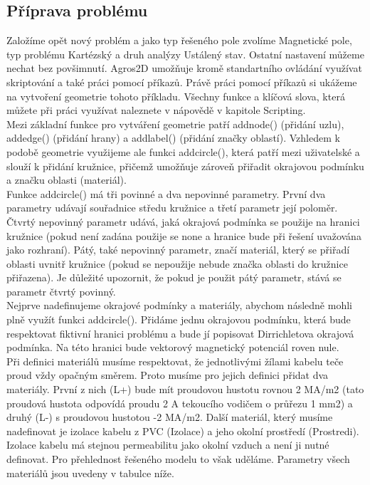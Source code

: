 \documentclass[a4paper, oneside]{article}
\begin{document}
\subsection{Příprava problému}
	Založíme opět nový problém a jako typ řešeného pole zvolíme Magnetické pole, typ problému Kartézský a druh analýzy Ustálený stav. Ostatní nastavení můžeme nechat bez povšimnutí. Agros2D umožňuje kromě standartního ovládání využívat skriptování a také práci pomocí příkazů. Právě práci pomocí příkazů si ukážeme na vytvoření geometrie tohoto příkladu. Všechny funkce a klíčová slova, která můžete při práci využívat naleznete v nápovědě v kapitole Scripting.\\
	Mezi základní funkce pro vytváření geometrie patří addnode() (přidání uzlu), addedge() (přidání hrany) a addlabel() (přidání značky oblastí). Vzhledem k podobě geometrie využijeme ale funkci addcircle(), která patří mezi uživatelské a slouží k přidání kružnice, přičemž umožňuje zároveň přiřadit okrajovou podmínku a značku oblasti (materiál).\\
	Funkce addcircle() má tři povinné a dva nepovinné parametry. První dva parametry udávají souřadnice středu kružnice a třetí parametr její poloměr. Čtvrtý nepovinný parametr udává, jaká okrajová podmínka se použije na hranici kružnice (pokud není zadána použije se none a hranice bude při řešení uvažována jako rozhraní). Pátý, také nepovinný parametr, značí materiál, který se přiřadí oblasti uvnitř kružnice (pokud se nepoužije nebude značka oblasti do kružnice přiřazena). Je důležité upozornit, že pokud je použit pátý parametr, stává se parametr čtvrtý povinný.\\
	Nejprve nadefinujeme okrajové podmínky a materiály, abychom následně mohli plně využít funkci addcircle(). Přidáme jednu okrajovou podmínku, která bude respektovat fiktivní hranici problému a bude jí popisovat Dirrichletova okrajová podmínka. Na této hranici bude vektorový magnetický potenciál roven nule.\\
	Při definici materiálů musíme respektovat, že jednotlivými žílami kabelu teče proud vždy opačným směrem. Proto musíme pro jejich definici přidat dva materiály. První z nich (L+) bude mít proudovou hustotu rovnou 2 MA/m2 (tato proudová hustota odpovídá proudu 2 A tekoucího vodičem o průřezu 1 mm2) a druhý (L-) s proudovou hustotou -2 MA/m2. Další materiál, který musíme nadefinovat je izolace kabelu z PVC (Izolace) a jeho okolní prostředí (Prostredi). Izolace kabelu má stejnou permeabilitu jako okolní vzduch a není ji nutné definovat. Pro přehlednost řešeného modelu to však uděláme. Parametry všech materiálů jsou uvedeny v tabulce níže.\\
	
\end{document}
